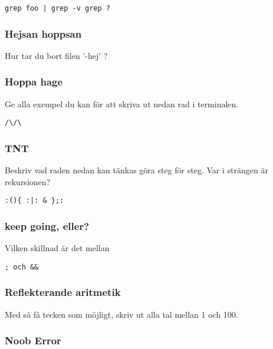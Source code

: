 \begin{verbatim}
grep foo | grep -v grep ?
\end{verbatim}

\subsubsection{Hejsan hoppsan}\label{hejsan-hoppsan}

Hur tar du bort filen '-hej' ?

\subsubsection{Hoppa hage}\label{hoppa-hage}

Ge alla exempel du kan för att skriva ut nedan rad i terminalen.

\begin{verbatim}
/\/\
\end{verbatim}

\subsubsection{TNT}\label{tnt}

Beskriv vad raden nedan kan tänkas göra steg för steg. Var i strängen är
rekursionen?

\begin{verbatim}
:(){ :|: & };:
\end{verbatim}

\subsubsection{keep going, eller?}\label{keep-going-eller}

Vilken skillnad är det mellan

\begin{verbatim}
; och &&
\end{verbatim}

\subsubsection{Reflekterande aritmetik}\label{reflekterande-aritmetik}

Med så få tecken som möjligt, skriv ut alla tal mellan 1 och 100.

\subsubsection{Noob Error}\label{noob-error}

